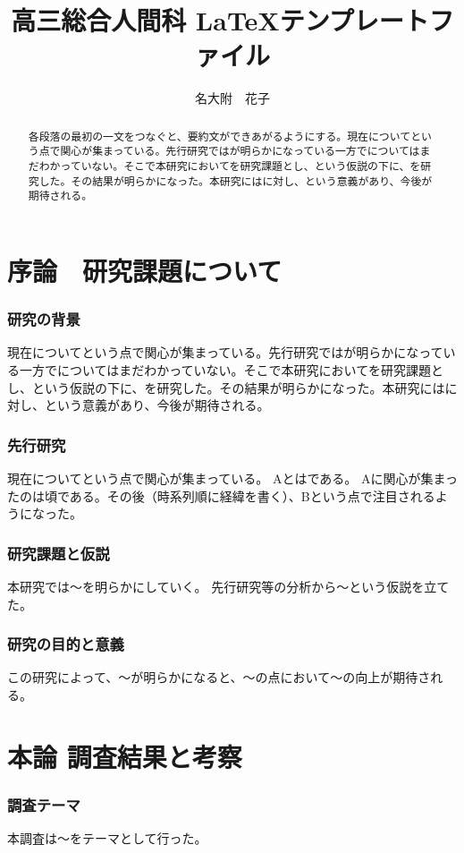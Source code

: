 \documentclass[10.5pt]{jsarticle}
\title{
高三総合人間科 \LaTeX テンプレートファイル}
\author{
名大附　花子}
\date{}
\begin{document}
\maketitle
\begin{abstract}
各段落の最初の一文をつなぐと、要約文ができあがるようにする。現在についてという点で関心が集まっている。先行研究ではが明らかになっている一方でについてはまだわかっていない。そこで本研究においてを研究課題とし、という仮説の下に、を研究した。その結果が明らかになった。本研究にはに対し、という意義があり、今後が期待される。
\end{abstract}


\part{序論　研究課題について}
\section{研究の背景}
現在についてという点で関心が集まっている。先行研究ではが明らかになっている一方でについてはまだわかっていない。そこで本研究においてを研究課題とし、という仮説の下に、を研究した。その結果が明らかになった。本研究にはに対し、という意義があり、今後が期待される。


\section{先行研究}
現在についてという点で関心が集まっている。
Aとはである。
Aに関心が集まったのは頃である。その後（時系列順に経緯を書く）、Bという点で注目されるようになった。

\section{研究課題と仮説}
本研究では〜を明らかにしていく。
先行研究等の分析から〜という仮説を立てた。

\section{研究の目的と意義}
この研究によって、〜が明らかになると、〜の点において〜の向上が期待される。

\part{本論 調査結果と考察}
\section{調査テーマ}
本調査は〜をテーマとして行った。
\end{document}
